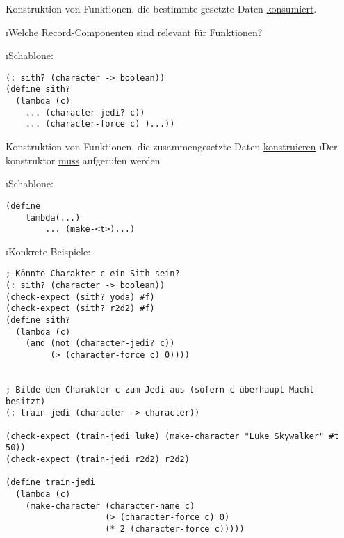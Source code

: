 Konstruktion von Funktionen, die bestimmte gesetzte Daten \underline{konsumiert}.\\
\begin{enumerate}[-]
\i Welche Record-Componenten sind relevant für Funktionen?
\begin{enumerate}[$\rightarrow$]
\i Schablone:
\begin{lstlisting}
(: sith? (character -> boolean))
(define sith?
  (lambda (c)
    ... (character-jedi? c))
    ... (character-force c) )...))
\end{lstlisting}
\end{enumerate}
Konstruktion von Funktionen, die zusammengesetzte Daten \underline{konstruieren}
\i Der konstruktor \underline{muss} aufgerufen werden
\begin{enumerate}[$\rightarrow$]
\i Schablone:
\begin{lstlisting}
(define
	lambda(...)
		... (make-<t>)...)
\end{lstlisting}
\end{enumerate}
\i Konkrete Beispiele:
\begin{lstlisting}[frame=single]
; Könnte Charakter c ein Sith sein?
(: sith? (character -> boolean))
(check-expect (sith? yoda) #f)
(check-expect (sith? r2d2) #f)
(define sith?
  (lambda (c)
    (and (not (character-jedi? c))
         (> (character-force c) 0))))


; Bilde den Charakter c zum Jedi aus (sofern c überhaupt Macht besitzt)
(: train-jedi (character -> character))

(check-expect (train-jedi luke) (make-character "Luke Skywalker" #t 50))
(check-expect (train-jedi r2d2) r2d2)

(define train-jedi
  (lambda (c)
    (make-character (character-name c) 
                    (> (character-force c) 0)
                    (* 2 (character-force c)))))
\end{lstlisting}
\end{enumerate}
